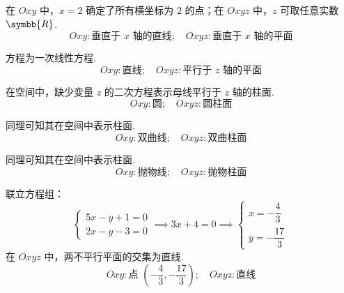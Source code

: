 \begin{solution}

    在 $Oxy$ 中，$x=2$ 确定了所有横坐标为 $2$ 的点；在 $Oxyz$ 中，$z$ 可取任意实数 $\symbb{R}$.
    \begin{equation*}
        \boxed{Oxy: \text{垂直于 } x \text{ 轴的直线}; \quad Oxyz: \text{垂直于 } x \text{ 轴的平面}}
    \end{equation*}


    方程为一次线性方程.
    \begin{equation*}
        \boxed{Oxy: \text{直线}; \quad Oxyz: \text{平行于 } z \text{ 轴的平面}}
    \end{equation*}


    在空间中，缺少变量 $z$ 的二次方程表示母线平行于 $z$ 轴的柱面.
    \begin{equation*}
        \boxed{Oxy: \text{圆}; \quad Oxyz: \text{圆柱面}}
    \end{equation*}


    同理可知其在空间中表示柱面.
    \begin{equation*}
        \boxed{Oxy: \text{双曲线}; \quad Oxyz: \text{双曲柱面}}
    \end{equation*}


    同理可知其在空间中表示柱面.
    \begin{equation*}
        \boxed{Oxy: \text{抛物线}; \quad Oxyz: \text{抛物柱面}}
    \end{equation*}


    联立方程组：
    \begin{equation*}
        \begin{cases} 5x - y + 1 = 0 \\ 2x - y - 3 = 0 \end{cases} \implies 3x + 4 = 0 \implies \begin{cases} x = -\dfrac{4}{3} \\ y = -\dfrac{17}{3} \end{cases}
    \end{equation*}
    在 $Oxyz$ 中，两不平行平面的交集为直线.
    \begin{equation*}
        \boxed{Oxy: \text{点 } \left( -\dfrac{4}{3}, -\dfrac{17}{3} \right); \quad Oxyz: \text{直线}}
    \end{equation*}


\end{solution}
